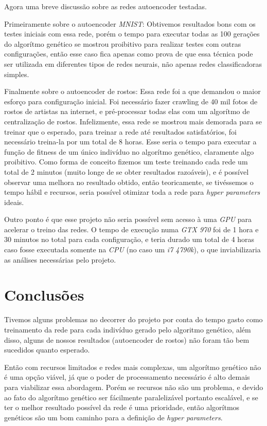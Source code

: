 \documentclass[twoside,conference,a4paper]{IEEEtran}
\begin{document}
Agora uma breve discussão sobre as redes autoencoder testadas. 

Primeiramente sobre o autoencoder \emph{MNIST}: Obtivemos resultados bons com os testes iniciais com essa rede, porém o tempo para executar todas as 100 gerações do algorítmo genético se mostrou proibitivo para realizar testes com outras configurações, então esse caso fica apenas como prova de que essa técnica pode ser utilizada em diferentes tipos de redes neurais, não apenas redes classificadoras simples.

Finalmente sobre o autoencoder de rostos: Essa rede foi a que demandou o maior esforço para configuração inicial. Foi necessário fazer crawling de 40 mil fotos de rostos de artistas na internet, e pré-processar todas elas com um algorítmo de centralização de rostos. Infelizmente, essa rede se mostrou mais demorada para se treinar que o esperado, para treinar a rede até resultados satisfatórios, foi necessário treina-la por um total de 8 horas. Esse seria o tempo para executar a função de fitness de um único indivíduo no algorítmo genético, claramente algo proibitivo. Como forma de conceito fizemos um teste treinando cada rede um total de 2 minutos (muito longe de se obter resultados razoáveis), e é possível observar uma melhora no resultado obtido, então teoricamente, se tivéssemos o tempo hábil e recursos, seria possível otimizar toda a rede para \emph{hyper parameters} ideais.


Outro ponto é que esse projeto não seria possível sem acesso à uma \emph{GPU} para acelerar o treino das redes. O tempo de execução numa \emph{GTX 970} foi de 1 hora e 30 minutos no total para cada configuração, e teria durado um total de 4 horas caso fosse executada somente na \emph{CPU} (no caso um \emph{i7 4790k}), o que inviabilizaria as análises necessárias pelo projeto.

\section{Conclusões}

Tivemos alguns problemas no decorrer do projeto por conta do tempo gasto como treinamento da rede para cada indivíduo gerado pelo algoritmo genético, além disso, alguns de nossos resultados (autoencoder de rostos) não foram tão bem sucedidos quanto esperado.

Então com recursos limitados e redes mais complexas, um algorítmo genético não é uma opção viável, já que o poder de processamento necessário é alto demais para viabilizar essa abordagem. Porém se recursos não são um problema, e devido ao fato do algorítmo genético ser fácilmente paralelizável portanto escalável, e se ter o melhor resultado possível da rede é uma prioridade, então algorítmos genéticos são um bom caminho para a definição de \emph{hyper parameters}. 
\end{document}
